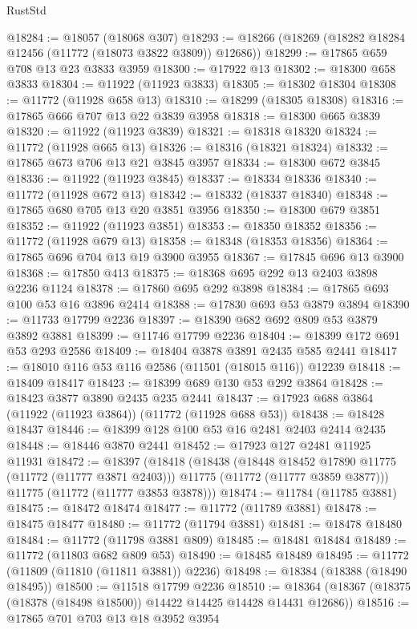 \begin{lexlean}{RustStd}
\begin{coremodule}
@18284 := @18057 (@18068 @307)
@18293 := @18266 (@18269 (@18282 @18284 @12456 (@11772 (@18073 @3822 @3809)) @12686))
@18299 := @17865 @659 @708 @13 @23 @3833 @3959
@18300 := @17922 @13
@18302 := @18300 @658 @3833
@18304 := @11922 (@11923 @3833)
@18305 := @18302 @18304
@18308 := @11772 (@11928 @658 @13)
@18310 := @18299 (@18305 @18308)
@18316 := @17865 @666 @707 @13 @22 @3839 @3958
@18318 := @18300 @665 @3839
@18320 := @11922 (@11923 @3839)
@18321 := @18318 @18320
@18324 := @11772 (@11928 @665 @13)
@18326 := @18316 (@18321 @18324)
@18332 := @17865 @673 @706 @13 @21 @3845 @3957
@18334 := @18300 @672 @3845
@18336 := @11922 (@11923 @3845)
@18337 := @18334 @18336
@18340 := @11772 (@11928 @672 @13)
@18342 := @18332 (@18337 @18340)
@18348 := @17865 @680 @705 @13 @20 @3851 @3956
@18350 := @18300 @679 @3851
@18352 := @11922 (@11923 @3851)
@18353 := @18350 @18352
@18356 := @11772 (@11928 @679 @13)
@18358 := @18348 (@18353 @18356)
@18364 := @17865 @696 @704 @13 @19 @3900 @3955
@18367 := @17845 @696 @13 @3900
@18368 := @17850 @413
@18375 := @18368 @695 @292 @13 @2403 @3898 @2236 @1124
@18378 := @17860 @695 @292 @3898
@18384 := @17865 @693 @100 @53 @16 @3896 @2414
@18388 := @17830 @693 @53 @3879 @3894
@18390 := @11733 @17799 @2236
@18397 := @18390 @682 @692 @809 @53 @3879 @3892 @3881
@18399 := @11746 @17799 @2236
@18404 := @18399 @172 @691 @53 @293 @2586
@18409 := @18404 @3878 @3891 @2435 @585 @2441
@18417 := @18010 @116 @53 @116 @2586 (@11501 (@18015 @116)) @12239
@18418 := @18409 @18417
@18423 := @18399 @689 @130 @53 @292 @3864
@18428 := @18423 @3877 @3890 @2435 @235 @2441
@18437 := @17923 @688 @3864 (@11922 (@11923 @3864)) (@11772 (@11928 @688 @53))
@18438 := @18428 @18437
@18446 := @18399 @128 @100 @53 @16 @2481 @2403 @2414 @2435
@18448 := @18446 @3870 @2441
@18452 := @17923 @127 @2481 @11925 @11931
@18472 := @18397
    (@18418
      (@18438
        (@18448 @18452 @17890 @11775 (@11772 (@11777 @3871 @2403)))
        @11775
        (@11772 (@11777 @3859 @3877)))
      @11775
      (@11772 (@11777 @3853 @3878)))
@18474 := @11784 (@11785 @3881)
@18475 := @18472 @18474
@18477 := @11772 (@11789 @3881)
@18478 := @18475 @18477
@18480 := @11772 (@11794 @3881)
@18481 := @18478 @18480
@18484 := @11772 (@11798 @3881 @809)
@18485 := @18481 @18484
@18489 := @11772 (@11803 @682 @809 @53)
@18490 := @18485 @18489
@18495 := @11772 (@11809 (@11810 (@11811 @3881)) @2236)
@18498 := @18384 (@18388 (@18490 @18495))
@18500 := @11518 @17799 @2236
@18510 := @18364 (@18367 (@18375 (@18378 (@18498 @18500)) @14422 @14425 @14428 @14431 @12686))
@18516 := @17865 @701 @703 @13 @18 @3952 @3954

\end{coremodule}
\end{lexlean}
